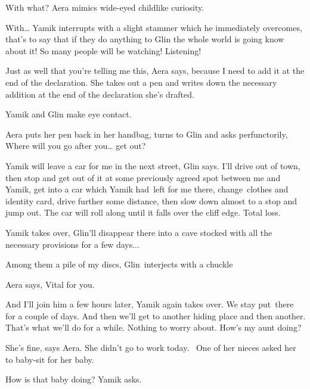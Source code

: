 \documentclass[twoside,11pt]{book}
\begin{document}
{\textquotedbl}With what?{\textquotedbl} Aera mimics wide-eyed childlike curiosity.

{\textquotedbl}With{\dots}{\textquotedbl} Yamik interrupts with a slight stammer which he immediately overcomes,
{\textquotedbl}that's to say that if they do anything to Glin the whole world is going know about it! So many people
will be watching! Listening!{\textquotedbl}

{\textquotedbl}Just as well that you're telling me this,{\textquotedbl} Aera says, {\textquotedbl}because I need to add
it at the end of the declaration.{\textquotedbl} She takes out a pen and writes down the necessary addition at the end
of the declaration she's drafted. 

Yamik and Glin make eye contact. 

Aera puts her pen back in her handbag, turns to Glin and asks perfunctorily, {\textquotedbl}Where will you go after
you{\dots} get out?{\textquotedbl} 

{\textquotedbl}Yamik will leave a car for me in the next street,{\textquotedbl} Glin says. {\textquotedbl}I'll drive out
of town, then stop and get out of it at some previously agreed spot between me and Yamik, get into a car which Yamik
had\ left for me there, change\ clothes and identity card, drive further some distance, then slow down almost to a stop
and jump out. The car will roll along until it falls over the cliff edge. Total loss.{\textquotedbl} 

Yamik takes over, {\textquotedbl}Glin'll disappear there into a cave stocked with all the necessary provisions for a few
days...{\textquotedbl} 

{\textquotedbl}Among them a pile of my discs,{\textquotedbl} Glin\ interjects with a chuckle\ 

Aera says, {\textquotedbl}Vital for you.{\textquotedbl} 

{\textquotedbl}And I{}'ll join him a few hours later,{\textquotedbl} Yamik again takes over. {\textquotedbl}We stay
put~there for a couple of days. And then we'll get to another hiding place and then another. That's what we'll do for a
while. Nothing to worry about. How's my aunt doing?{\textquotedbl} 

{\textquotedbl}She's fine,{\textquotedbl} says Aera. {\textquotedbl}She didn't go to work today.~ One of her nieces
asked her to baby-sit for her baby.{\textquotedbl} 

{\textquotedbl}How is that baby doing?{\textquotedbl} Yamik asks. 
\end{document}
